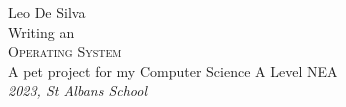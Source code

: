 \begin{titlepage}
	\raggedleft
	{\Large Leo De Silva\\[1in]}
	{\large Writing an\\}
	{\Huge\scshape Operating System\\[.2in]}
	{\large A pet project for my Computer Science A Level NEA\\}
	\vfill
	{\itshape 2023, St Albans School}
\end{titlepage}
\restoregeometry